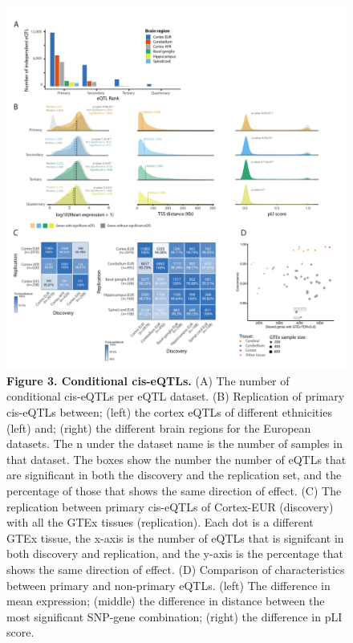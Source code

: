 {{\begin{figure}[H]
	\includegraphics[width=\textwidth]{chapters/chapter5-brain-eqtls/img/2020-12-02-fig3-ciseqtls-v12.pdf}
	\caption{\textbf{Figure 3. Conditional cis-eQTLs.} (A) The number of conditional cis-eQTLs per eQTL dataset. (B) Replication of primary cis-eQTLs between; (left) the cortex eQTLs of different ethnicities (left) and; (right) the different brain regions for the European datasets. The n under the dataset name is the number of samples in that dataset. The boxes show the number the number of eQTLs that are significant in both the discovery and the replication set, and the percentage of those that shows the same direction of effect. (C) The replication between primary cis-eQTLs of Cortex-EUR (discovery) with all the GTEx tissues (replication). Each dot is a different GTEx tissue, the x-axis is the number of eQTLs that is signifcant in both discovery and replication, and the y-axis is the percentage that shows the same direction of effect. (D) Comparison of characteristics between primary and non-primary eQTLs. (left) The difference in mean expression; (middle) the difference in distance between the most significant SNP-gene combination; (right) the difference in pLI score.}
\end{figure}

}}
